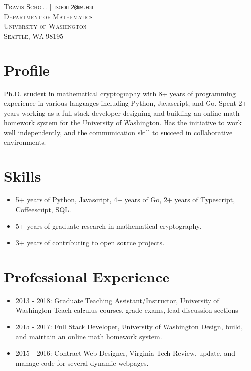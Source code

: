\documentclass{article}
\begin{document}
	
	\vspace*{-1in}
	
	\begin{center}
	\textsc{
		Travis Scholl $\vert$ {\tt tscholl2@uw.edu} \\
		Department of Mathematics \\
		University of Washington \\
		Seattle, WA 98195
	}
	\end{center}
	
	\section{Profile}
	
	Ph.D. student in mathematical cryptography with 8+ years of programming experience in various languages including Python, Javascript, and Go. Spent 2+ years working as a full-stack developer designing and building an online math homework system for the University of Washington. Has the initiative to work well independently, and the communication skill to succeed in collaborative environments.
	
	\section{Skills}
	
	\begin{itemize} 
		\item 5+ years of Python, Javascript, 4+ years of Go, 2+ years of Typescript, Coffeescript, SQL.
		\item 5+ years of graduate research in mathematical cryptography.
		\item 3+ years of contributing to open source projects.
	\end{itemize}

	\section{Professional Experience}
	
	\begin{itemize}  
		\item 2013 - 2018: Graduate Teaching Assistant/Instructor, University of Washington
			\subitem Teach calculus courses, grade exams, lead discussion sections
		\item 2015 - 2017: Full Stack Developer, University of Washington
			\subitem Design, build, and maintain an online math homework system.
		\item 2015 - 2016: Contract Web Designer, Virginia Tech
			\subitem Review, update, and manage code for several dynamic webpages.
	\end{itemize}
	
\end{document}
